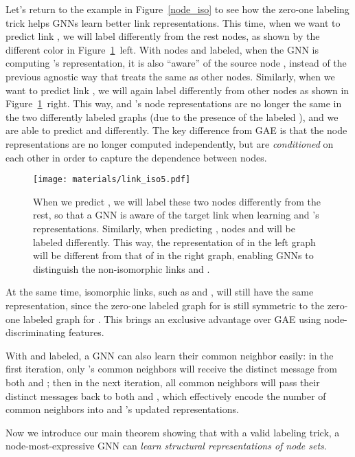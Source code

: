 \documentclass{article}
\begin{document}
Let's return to the example in Figure~\ref{node_iso} to see how the zero-one labeling trick helps GNNs learn better link representations. This time, when we want to predict link , we will label  differently from the rest nodes, as shown by the different color in Figure~\ref{link_iso}~left. With nodes  and  labeled, when the GNN is computing 's representation, it is also ``aware'' of the source node , instead of the previous agnostic way that treats  the same as other nodes. Similarly, when we want to predict link , we will again label  differently from other nodes as shown in Figure~\ref{link_iso}~right. This way,  and 's node representations are no longer the same in the two differently labeled graphs (due to the presence of the labeled ), and we are able to predict  and  differently. The key difference from GAE is that the node representations are no longer computed independently, but are \textit{conditioned} on each other in order to capture the dependence between nodes.





\begin{figure}[tp]
\centering
\texttt{[image: materials/link\_iso5.pdf]}
\caption{\small When we predict , we will label these two nodes differently from the rest, so that a GNN is aware of the target link when learning  and 's representations. Similarly, when predicting , nodes  and  will be labeled differently. This way, the representation of  in the left graph will be different from that of  in the right graph, enabling GNNs to distinguish the non-isomorphic links  and .
}
\label{link_iso}
\end{figure}


At the same time, isomorphic links, such as  and , will still have the same representation, since the zero-one labeled graph for  is still symmetric to the zero-one labeled graph for . This brings an exclusive advantage over GAE using node-discriminating features. 

With  and  labeled, a GNN can also learn their common neighbor easily: in the first iteration, only 's common neighbors will receive the distinct message from both  and ; then in the next iteration, all common neighbors will pass their distinct messages back to both  and , which effectively encode the number of common neighbors into  and 's updated representations.





Now we introduce our main theorem showing that with a valid labeling trick, a node-most-expressive GNN can \textit{learn structural representations of node sets}. 
\end{document}
